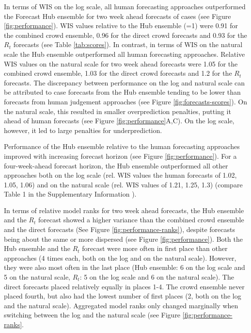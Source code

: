 \documentclass[10pt,a4paper,twocolumn]{article}
\begin{document}
In terms of WIS on the log scale, all human forecasting approaches outperformed the Forecast Hub ensemble for two week ahead forecasts of cases (see Figure \ref{fig:performance}). WIS values relative to the Hub ensemble (=1) were 0.91 for the combined crowd ensemble, 0.96 for the direct crowd forecasts and 0.93 for the $R_t$ forecasts (see Table \ref{tab:scores}). In contrast, in terms of WIS on the natural scale the Hub ensemble outperformed all human forecasting approaches. Relative WIS values on the natural scale for two week ahead forecasts were 1.05 for the combined crowd ensemble, 1.03 for the direct crowd forecasts and 1.2 for the $R_t$ forecasts. 
The discrepancy between performance on the log and natural scale  can be attributed to case forecasts from the Hub ensemble tending to be lower than forecasts from human judgement approaches (see Figure \ref{fig:forecasts-scores}). On the natural scale, this resulted in smaller overprediction penalties, putting it ahead of human forecasts (see Figure \ref{fig:performance}A,C). On the log scale, however, it led to large penalties for underprediction. 



Performance of the Hub ensemble relative to the human forecasting approaches improved with increasing forecast horizon (see Figure \ref{fig:performance}). For a four-week-ahead forecast horizon, the Hub ensemble outperformed all other approaches both on the log scale (rel. WIS values the human forecasts of 1.02, 1.05, 1.06) and on the natural scale (rel. WIS values of 1.21, 1.25, 1.3) (compare Table 1 in the Supplementary Information \cite{bosseSupplementaryInformationHuman2023}). 


In terms of relative model ranks for two week ahead forecasts, the Hub ensemble and the $R_t$ forecast showed a higher variance than the combined crowd ensemble and the direct forecasts (See Figure \ref{fig:performance-ranks}), despite forecasts being about the same or more dispersed (see Figure \ref{fig:performance}). Both the Hub ensemble and the $R_t$ forecast were more often in first place than other approaches (4 times each, both on the log and on the natural scale). However, they were also most often in the last place (Hub ensemble: 6 on the log scale and 5 on the natural scale, $R_t$: 5 on the log scale and 6 on the natural scale). The direct forecasts placed relatively equally in places 1-4. The crowd ensemble never placed fourth, but also had the lowest number of first places (2, both on the log and the natural scale). Aggregated model ranks only changed marginally when switching between the log and the natural scale (see Figure \ref{fig:performance-ranks}. 
\end{document}
